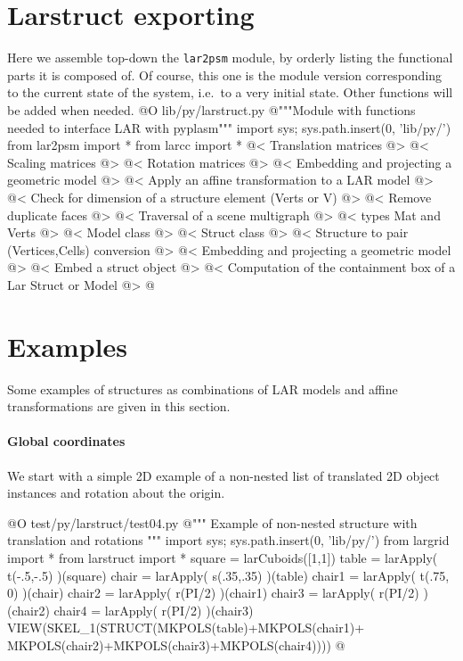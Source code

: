 \documentclass[11pt,oneside]{article}    %
\begin{document}
\section{Larstruct exporting}
\label{sec:larstruct}
Here we assemble top-down the \texttt{lar2psm} module, by orderly listing the functional parts it is composed of. Of course, this one is the module version corresponding to the current state of the system, i.e.~to a very initial state. Other functions will be added when needed.
@O lib/py/larstruct.py
@{"""Module with functions needed to interface LAR with pyplasm"""
import sys; sys.path.insert(0, 'lib/py/')
from lar2psm import *
from larcc import *
@< Translation matrices @>
@< Scaling matrices @>
@< Rotation matrices @>
@< Embedding and projecting a geometric model @>
@< Apply an affine transformation to a LAR model @>
@< Check for dimension of a structure element (Verts or V) @>
@< Remove duplicate faces @>
@< Traversal of a scene multigraph @>
@< types Mat and Verts @>
@< Model class @>
@< Struct class @>
@< Structure to pair (Vertices,Cells) conversion @>
@< Embedding and projecting a geometric model @>
@< Embed a struct object @>
@< Computation of the containment box of a Lar Struct or Model @>
@}

\section{Examples}
Some examples of structures as combinations of LAR models and affine transformations are given in this section. 

\paragraph{Global coordinates}
We start with a simple 2D example of a non-nested list of translated 2D object instances and rotation about the origin.

@O test/py/larstruct/test04.py
@{""" Example of non-nested structure with translation and rotations """
import sys; sys.path.insert(0, 'lib/py/')
from largrid import *
from larstruct import *
square = larCuboids([1,1])
table = larApply( t(-.5,-.5) )(square)
chair = larApply( s(.35,.35) )(table)
chair1 = larApply( t(.75, 0) )(chair)
chair2 = larApply( r(PI/2) )(chair1)
chair3 = larApply( r(PI/2) )(chair2)
chair4 = larApply( r(PI/2) )(chair3)
VIEW(SKEL_1(STRUCT(MKPOLS(table)+MKPOLS(chair1)+
                   MKPOLS(chair2)+MKPOLS(chair3)+MKPOLS(chair4))))
@}
\end{document}
